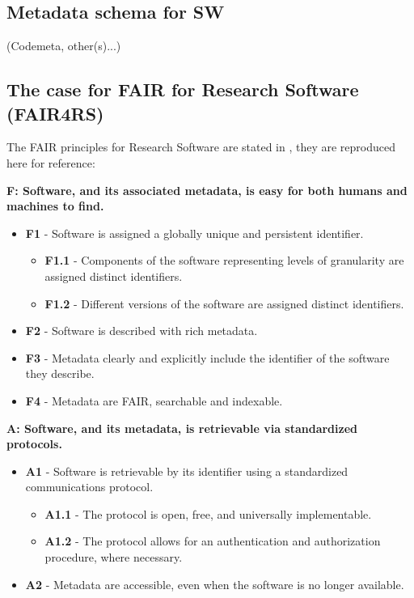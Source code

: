 \subsection{Metadata schema for SW}

(Codemeta, other(s)...)

\subsection{The case for FAIR for Research Software (FAIR4RS)}

The FAIR principles for Research Software are stated in \cite{chue_hong_neil_p_2022_6623556}, they
are reproduced here for reference:

\textbf{F: Software, and its associated metadata, is easy for both humans and machines to find.}

\begin{itemize}
    \item \textbf{F1} - Software is assigned a globally unique and persistent identifier.
    \begin{itemize}
        \item \textbf{F1.1} - Components of the software representing levels of granularity are assigned distinct identifiers.
        \item \textbf{F1.2} - Different versions of the software are assigned distinct identifiers.
    \end{itemize}

    \item \textbf{F2} - Software is described with rich metadata.
    \item \textbf{F3} - Metadata clearly and explicitly include the identifier of the software they describe.
    \item \textbf{F4} - Metadata are FAIR, searchable and indexable.
\end{itemize}

\textbf{A: Software, and its metadata, is retrievable via standardized protocols.}

\begin{itemize}
    \item \textbf{A1} - Software is retrievable by its identifier using a standardized communications protocol.

    \begin{itemize}
        \item \textbf{A1.1} - The protocol is open, free, and universally implementable.
        \item \textbf{A1.2} - The protocol allows for an authentication and authorization procedure, where necessary.
    \end{itemize}

    \item \textbf{A2} - Metadata are accessible, even when the software is no longer available.
\end{itemize}

